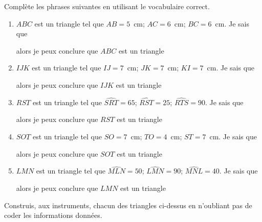 \begin{myenumerate}
\item Complète les phrases suivantes en utilisant le vocabulaire
correct.
\begin{enumerate}
\item $ABC$ est un triangle tel que $AB=5$~cm; $AC=6$~cm;
$BC=6$~cm. Je sais que \dotfill\par\dotfill\par alors je peux conclure
que $ABC$ est un triangle\dotfill
\item $IJK$ est un triangle tel que $IJ=7$~cm; $JK=7$~cm;
$KI=7$~cm. Je sais que \dotfill\par\dotfill\par alors je peux conclure
que $IJK$ est un triangle\dotfill
\item $RST$ est un triangle tel que $\widehat{SRT}=65$\degres;
$\widehat{RST}=25$\degres; $\widehat{RTS}=90$\degres. Je sais que
\dotfill\par\dotfill\par alors je peux conclure que $RST$ est un
triangle\dotfill
\item $SOT$ est un triangle tel que $SO=7$~cm; $TO=4$~cm;
$ST=7$~cm. Je sais que \dotfill\par\dotfill\par alors je peux conclure
que $SOT$ est un triangle\dotfill
\item $LMN$ est un triangle tel que $\widehat{MLN}=50$\degres;
$\widehat{LMN}=90$\degres; $\widehat{MNL}=40$\degres. Je sais que
\dotfill\par\dotfill\par alors je peux conclure que $LMN$ est un
triangle\dotfill
\end{enumerate}
\item Construis, aux instruments, chacun des triangles ci-dessus en
n'oubliant pas de coder les informations données.
\end{myenumerate}